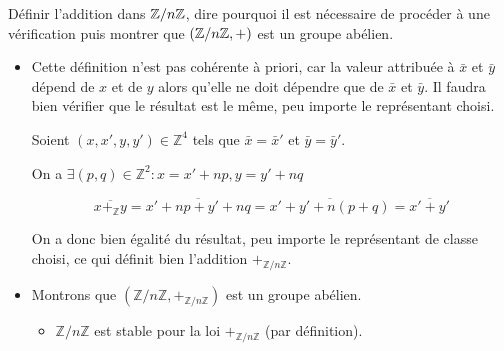 \documentclass{article}
\renewenvironment{question_kholle}[2][ ]
{
	\subsection{\texorpdfstring{#2}{}}
	\notblank{#1}
	{
		\noindent #1
		\bigbreak
	}
	{}
	\begin{proof}
}
{
	\end{proof}
}
\begin{document}
\begin{question_kholle}{Définir l’addition dans $\mathbb Z/n\mathbb Z$, dire pourquoi il est nécessaire de procéder à une vérification puis montrer que $(\mathbb Z/n\mathbb Z, +)$ est un groupe abélien.}
	\begin{itemize}[label=$\star$]
		\item Cette définition n'est pas cohérente à priori, car la valeur attribuée à $\bar x$ et $\bar y$ dépend de $x$ et de $y$ alors qu'elle ne doit dépendre que de $\bar x$ et $\bar y$. Il faudra bien vérifier que le résultat est le même, peu importe le représentant choisi.

		      Soient $(x, x', y, y') \in \mathbb{Z}^{4}$ tels que $\bar{x} = \bar{x}'$ et $\bar{y} = \bar{y}'$.

		      On a $\exists (p, q) \in \mathbb{Z}^{2} : x = x' + np, y=y'+nq$

		      $$
			      \overline{x+_{\mathbb{Z}}y} = \overline{x'+np + y' + nq} = \overline{x'+y' + n(p+q)} = \overline{x'+y'}
		      $$

		      On a donc bien égalité du résultat, peu importe le représentant de classe choisi, ce qui définit bien l'addition $+_{\mathbb{Z}/n\mathbb{Z}}$.

		\item Montrons que $(\mathbb{Z}/n\mathbb{Z}, +_{\mathbb{Z}/n\mathbb{Z}})$ est un groupe abélien.
		      \begin{itemize}[label=$\bullet$]
			      \item $\mathbb{Z}/n\mathbb{Z}$ est stable pour la loi $+_{\mathbb{Z}/n\mathbb{Z}}$ (par définition).


\end{itemize}
\end{itemize}
\end{question_kholle}
\end{document}
